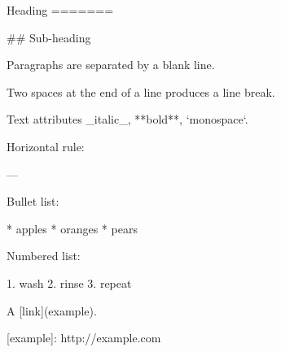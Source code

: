 Heading
=======

## Sub-heading

Paragraphs are separated
by a blank line.

Two spaces at the end of a line  
produces a line break.

Text attributes _italic_, 
**bold**, `monospace`.

Horizontal rule:

---

Bullet list:

  * apples
  * oranges
  * pears

Numbered list:

  1. wash
  2. rinse
  3. repeat

A [link](example).

  [example]: http://example.com
